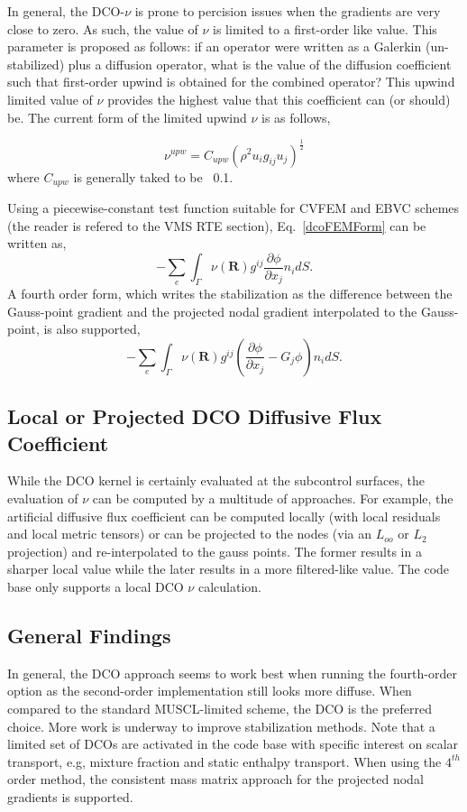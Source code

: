 In general, the DCO-$\nu$ is prone to percision issues when the gradients are very close to zero. As such, the 
value of $\nu$ is limited to a first-order like value. This parameter is proposed as follows: if an operator
were written as a Galerkin (un-stabilized) plus a diffusion operator, what is the value of the diffusion coefficient
such that first-order upwind is obtained for the combined operator? This upwind limited value of $\nu$ provides the
highest value that this coefficient can (or should) be. The current form of the limited upwind $\nu$ is as follows,

\begin{equation}
  \nu^{upw} = C_{upw}(\rho^2  u_i g_{ij} u_j )^{\frac{1}{2}}
\label{dcoFVForm}
\end{equation}
where $C_{upw}$ is generally taked to be ~0.1.

Using a piecewise-constant test function suitable for CVFEM and EBVC schemes (the reader is refered to 
the VMS RTE section), Eq.~\ref{dcoFEMForm} can be written as,
\begin{equation}
  -\sum_e \int_\Gamma \nu(\mathbf{R}) g^{ij} \frac{\partial \phi} {\partial x_j} n_i dS.
\label{dcoFVForm}
\end{equation}
%
A fourth order form, which writes the stabilization as the difference between the Gauss-point gradient 
and the projected nodal gradient interpolated to the Gauss-point, is also supported,
\begin{equation}
  -\sum_e \int_\Gamma \nu(\mathbf{R}) g^{ij} (\frac{\partial \phi} {\partial x_j} - G_j \phi ) n_i dS.
\label{dcoFVForm4th}
\end{equation}

\subsection{Local or Projected DCO Diffusive Flux Coefficient}
While the DCO kernel is certainly evaluated at the subcontrol surfaces, the evaluation of $\nu$ can be 
computed by a multitude of approaches. For example, the artificial diffusive flux coefficient 
can be computed locally (with local residuals and local metric tensors) or can be projected 
to the nodes (via an $L_{oo}$ or $L_2$ projection) and re-interpolated to the gauss points. 
The former results in a sharper local value while the later results in a more filtered-like value.
The code base only supports a local DCO $\nu$ calculation.

\subsection{General Findings}
In general, the DCO approach seems to work best when running the fourth-order option as the second-order 
implementation still looks more diffuse. When compared to the standard MUSCL-limited scheme, the DCO
is the preferred choice. More work is underway to improve stabilization methods.
Note that a limited set of DCOs are activated in the code base with specific
interest on scalar transport, e.g, mixture fraction and static enthalpy transport. When using the $4^{th}$ 
order method, the consistent mass matrix approach for the projected nodal gradients is supported.
